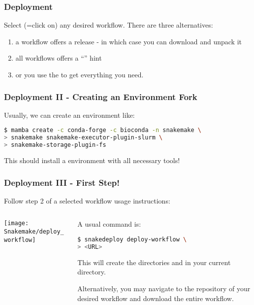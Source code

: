 \begin{frame}[fragile]
  \frametitle{Deployment}
  Select (=click on) any desired workflow. There are three alternatives:
  \begin{enumerate}[<+->]
   \item a workflow offers a release - in which case you can download and unpack it
   \item all workflows offers a ``'' hint
   \item or you use the  to get everything you need.
  \end{enumerate}
\end{frame}

\begin{frame}[fragile]
	\frametitle{Deployment II - Creating an Environment Fork}
	Usually, we can create an environment like:
	\begin{lstlisting}[language=Bash, style=Shell]
$ mamba create -c conda-forge -c bioconda -n snakemake \
> snakemake snakemake-executor-plugin-slurm \
> snakemake-storage-plugin-fs
    \end{lstlisting}
    This should install a \Snakemake{} environment with all necessary tools!
\end{frame}

\begin{frame}[fragile]
	\frametitle{Deployment III - First Step!}
	Follow step 2 of a selected workflow usage instructions:
	\begin{columns}
		\begin{column}{0.4\textwidth}
			\centering
			\texttt{[image: Snakemake/deploy\_workflow]}
		\end{column}
	    \begin{column}{0.6\textwidth}
	    	A usual command is:
	    	\begin{lstlisting}[language=Bash, style=Shell]
$ snakedeploy deploy-workflow \
> <URL>
	    	\end{lstlisting}
    	    This will create the directories  and  in your current directory.
    	    \begin{hint}
    	    	Alternatively, you may navigate to the repository of your desired workflow and download the entire workflow.
    	    \end{hint}
	    \end{column}
	\end{columns}
\end{frame}

